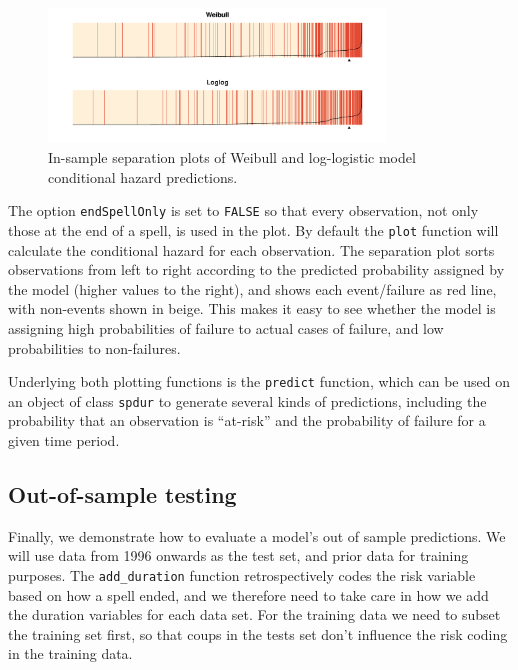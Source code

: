 \documentclass[12pt,onesided]{amsart}
\begin{document}
\begin{figure}
\begin{center}
\includegraphics[width=0.8\textwidth]{graphics/sepplots.pdf}
\caption{In-sample separation plots of Weibull and log-logistic model conditional hazard predictions.}
\label{insamp}
\end{center}
\end{figure}

The option \texttt{endSpellOnly} is set to \texttt{FALSE} so that every
observation, not only those at the end of a spell, is used in the plot.
By default the \texttt{plot} function will calculate the conditional
hazard for each observation. The separation plot sorts observations from
left to right according to the predicted probability assigned by the
model (higher values to the right), and shows each event/failure as red
line, with non-events shown in beige. This makes it easy to see whether
the model is assigning high probabilities of failure to actual cases of
failure, and low probabilities to non-failures.

Underlying both plotting functions is the \texttt{predict} function, which
can be used on an object of class \texttt{spdur} to generate several kinds
of predictions, including the probability that an observation is
``at-risk'' and the probability of failure for a given time period.

\subsection{Out-of-sample testing}

Finally, we demonstrate how to evaluate a model's out of sample
predictions. We will use data from 1996 onwards as the test set, and
prior data for training purposes. The \verb|add_duration| function
retrospectively codes the risk variable based on how a spell ended, and
we therefore need to take care in how we add the duration variables for
each data set. For the training data we need to subset the training set
first, so that coups in the tests set don't influence the risk coding in
the training data.
\end{document}
